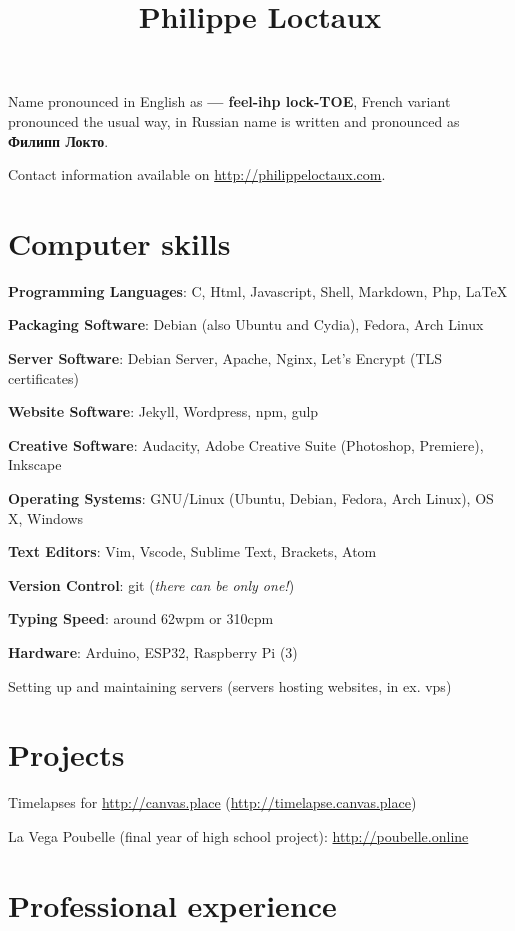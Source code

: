 \documentclass[a4paper]{article}
\title{Philippe Loctaux}
\date{\vspace{-5ex}}
\begin{document}
\maketitle

Name pronounced in English as \textbf{ — feel-ihp lock-TOE}, French variant pronounced the usual way, in Russian name is written and pronounced as \textbf{Филипп Локто}.

Contact information available on \url{http://philippeloctaux.com}.

\section*{Computer skills}

\textbf{Programming Languages}: C, Html, Javascript, Shell, Markdown, Php, \LaTeX

\textbf{Packaging Software}: Debian (also Ubuntu and Cydia), Fedora, Arch Linux

\textbf{Server Software}: Debian Server, Apache, Nginx, Let's Encrypt (TLS certificates)

\textbf{Website Software}: Jekyll, Wordpress, npm, gulp

\textbf{Creative Software}: Audacity, Adobe Creative Suite (Photoshop, Premiere), Inkscape

\textbf{Operating Systems}: GNU/Linux (Ubuntu, Debian, Fedora, Arch Linux), OS X, Windows

\textbf{Text Editors}: Vim, Vscode, Sublime Text, Brackets, Atom

\textbf{Version Control}: git (\textit{there can be only one!})

\textbf{Typing Speed}: around 62wpm or 310cpm

\textbf{Hardware}: Arduino, ESP32, Raspberry Pi (3)

Setting up and maintaining servers (servers hosting websites, in ex. vps)

\section*{Projects}

Timelapses for \url{http://canvas.place} (\url{http://timelapse.canvas.place})

La Vega Poubelle (final year of high school project): \url{http://poubelle.online}

\section*{Professional experience}
\end{document}
